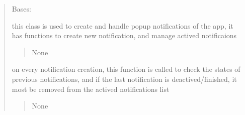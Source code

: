 \documentclass[letterpaper,10pt,english]{sphinxmanual}
\begin{document}
\begin{quote}
\begin{savenotes}
\begin{fulllineitems}
\end{fulllineitems}\end{savenotes}


\begin{savenotes}\begin{fulllineitems}
\label{\detokenize{setting/notif_UI:oxin.notif_UI.notification_manager}}
\pysigstartsignatures
{}
\pysigstopsignatures
\sphinxAtStartPar
Bases: 

\sphinxAtStartPar
this class is used to create and handle pop\sphinxhyphen{}up notifications of the app, it has functions to create new notification,
and manage actived notificaions
\begin{quote}\begin{description}
\sphinxAtStartPar
None

\end{description}\end{quote}

\begin{savenotes}\begin{fulllineitems}
\label{\detokenize{setting/notif_UI:oxin.notif_UI.notification_manager.check_active_notifs}}
\pysigstartsignatures
{}
\pysigstopsignatures
\sphinxAtStartPar
on every notification creation, this function is called to check the states of previous notifications, and if the last notification is
deactived/finished, it most be removed from the actived notifications list
\begin{quote}\begin{description}
\sphinxAtStartPar
None

\end{description}\end{quote}

\end{fulllineitems}\end{savenotes}


\end{fulllineitems}
\end{savenotes}
\end{quote}
\end{document}
